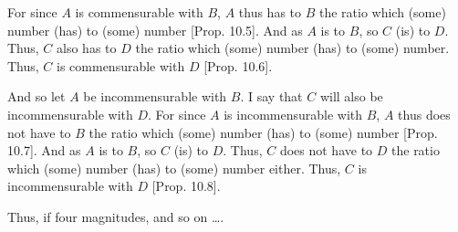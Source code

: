 \begin{Parallel}{}{}
{For since $A$ is commensurable with $B$, $A$ thus has to $B$ the ratio
which (some) number (has) to (some) number [Prop. 10.5]. And as $A$ is to $B$, so $C$ (is) to $D$. Thus, $C$ also has to $D$ the ratio which (some) number (has) to
(some) number. Thus, $C$ is commensurable with $D$ [Prop. 10.6].

And so let $A$ be incommensurable with $B$. I say that $C$ will also
be incommensurable with $D$. For since $A$ is incommensurable with
$B$, $A$ thus does not have to $B$ the ratio which  (some) number (has) to
(some) number [Prop. 10.7]. And as $A$ is to $B$, so $C$ (is) to $D$. Thus, $C$ does not have to $D$ the ratio which (some) number (has) to
(some) number either. Thus, $C$ is incommensurable with $D$ [Prop. 10.8].

Thus, if four magnitudes, and so on \ldots.}
\end{Parallel}

